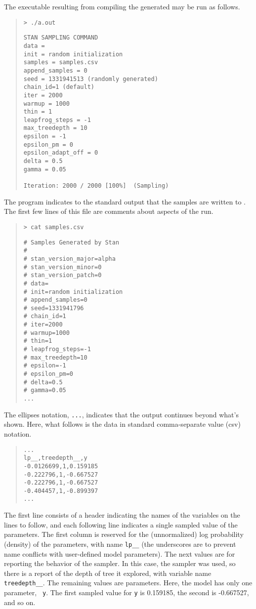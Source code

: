 The executable resulting from compiling the generated \Cpp may be run
as follows.
%
\begin{quote}
\begin{Verbatim}[fontshape=sl]
> ./a.out
\end{Verbatim}
%
\begin{Verbatim}
STAN SAMPLING COMMAND
data = 
init = random initialization
samples = samples.csv
append_samples = 0
seed = 1331941513 (randomly generated)
chain_id=1 (default)
iter = 2000
warmup = 1000
thin = 1
leapfrog_steps = -1
max_treedepth = 10
epsilon = -1
epsilon_pm = 0
epsilon_adapt_off = 0
delta = 0.5
gamma = 0.05

Iteration: 2000 / 2000 [100%]  (Sampling)
\end{Verbatim}
\end{quote}
%
The program indicates to the standard output that the samples are
written to .  The first few lines of this file
are comments about aspects of the run.
%
\begin{quote}
\begin{Verbatim}[fontshape=sl]
> cat samples.csv
\end{Verbatim}
\begin{Verbatim}
# Samples Generated by Stan
#
# stan_version_major=alpha
# stan_version_minor=0
# stan_version_patch=0
# data=
# init=random initialization
# append_samples=0
# seed=1331941796
# chain_id=1
# iter=2000
# warmup=1000
# thin=1
# leapfrog_steps=-1
# max_treedepth=10
# epsilon=-1
# epsilon_pm=0
# delta=0.5
# gamma=0.05
...
\end{Verbatim}
\end{quote}
%
The ellipses notation, {\tt ...}, indicates that the output continues
beyond what's shown.  Here, what follows is the data in standard
comma-separate value ({\sc csv}) notation.
%
\begin{quote}
\begin{Verbatim}
...
lp__,treedepth__,y
-0.0126699,1,0.159185
-0.222796,1,-0.667527
-0.222796,1,-0.667527
-0.404457,1,-0.899397
...
\end{Verbatim}
\end{quote}
%
The first line consists of a header indicating the names of the
variables on the lines to follow, and each following line indicates a
single sampled value of the parameters.  The first column is reserved
for the (unnormalized) log probability (density) of the parameters,
with name {\tt lp\_\_} (the underscores are to prevent name conflicts
with user-defined model parameters).  The next values are for
reporting the behavior of the sampler.  In this case, the \NUTS
sampler was used, so there is a report of the depth of tree it
explored, with variable name {\tt treedepth\_\_}.  The remaining
values are parameters.  Here, the model has only one parameter, {\tt
  y}.  The first sampled value for {\tt y} is 0.159185, the second is
-0.667527, and so on.  

